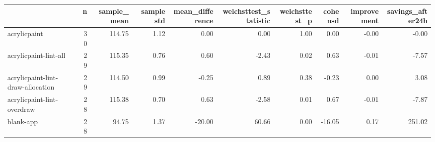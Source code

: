 \begin{tabular}{lrrrrrrrrr}
\toprule
{} &   n &  sample\_mean &  sample\_std &  mean\_difference &  welchsttest\_statistic &  welchsttest\_p &  cohensd &  improvement &  savings\_after24h \\
\midrule
acrylicpaint                      &  30 &       114.75 &        1.12 &             0.00 &                   0.00 &           1.00 &     0.00 &        -0.00 &             -0.00 \\
acrylicpaint-lint-all             &  29 &       115.35 &        0.76 &             0.60 &                  -2.43 &           0.02 &     0.63 &        -0.01 &             -7.57 \\
acrylicpaint-lint-draw-allocation &  29 &       114.50 &        0.99 &            -0.25 &                   0.89 &           0.38 &    -0.23 &         0.00 &              3.08 \\
acrylicpaint-lint-overdraw        &  28 &       115.38 &        0.70 &             0.63 &                  -2.58 &           0.01 &     0.67 &        -0.01 &             -7.87 \\
blank-app                         &  28 &        94.75 &        1.37 &           -20.00 &                  60.66 &           0.00 &   -16.05 &         0.17 &            251.02 \\
\bottomrule
\end{tabular}
